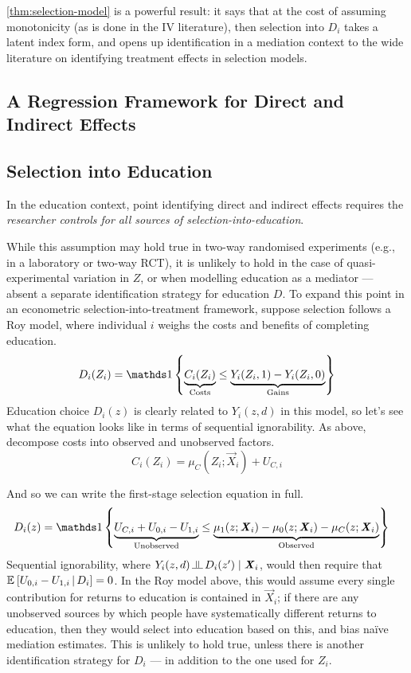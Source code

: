 \autoref{thm:selection-model} is a powerful result: it says that at the cost of assuming monotonicity (as is done in the IV literature), then selection into $D_i$ takes a latent index form, and opens up identification in a mediation context to the wide literature on identifying treatment effects in selection models.

\subsection{A Regression Framework for Direct and Indirect Effects}

\subsection{Selection into Education}
In the education context, point identifying direct and indirect effects requires the \textit{researcher controls for all sources of selection-into-education}.

While this assumption may hold true in two-way randomised experiments (e.g., in a laboratory or two-way RCT), it is unlikely to hold in the case of quasi-experimental variation in $Z$, or when modelling education as a mediator --- absent a separate identification strategy for education $D$.
To expand this point in an econometric selection-into-treatment framework, suppose selection follows a Roy model, where individual $i$ weighs the costs and benefits of completing education.
\[ D_i(Z_i) = \indicator{
    \underbrace{C_i(Z_i)}_{\text{Costs}}
    \leq
    \underbrace{Y_i(Z_i, 1) - Y_i(Z_i, 0)}_{\text{Gains}}} \]
Education choice $D_i(z)$ is clearly related to $Y_i(z, d)$ in this model, so let's see what the equation looks like in terms of sequential ignorability.
As above, decompose costs into observed and unobserved factors.
\[ C_i(Z_i) = \mu_{C}(Z_i; \vec X_i) + U_{C,i} \]

And so we can write the first-stage selection equation in full.
\begin{align*}
    D_i(z) &= \indicator{
        \underbrace{U_{C, i} + U_{0, i} - U_{1, i}}_{\text{Unobserved}}
        \leq
        \underbrace{
            \mu_1(z; \vec X_i) - \mu_0(z; \vec X_i)- \mu_C(z; \vec X_i)}_{\text{Observed}}}
\end{align*}
Sequential ignorability, where $Y_i(z, d) \indep D_i(z') \; | \; \vec X_i$, would then require that $\mathbb{E}_{} \left[ U_{0, i} - U_{1, i} \, \middle\vert \, D_i \right] = 0$.
In the Roy model above, this would assume every single contribution for returns to education is contained in $\vec X_i$; if there are any unobserved sources by which people have systematically different returns to education, then they would select into education based on this, and bias na\"ive mediation estimates.
This is unlikely to hold true, unless there is another identification strategy for $D_i$ --- in addition to the one used for $Z_i$.

